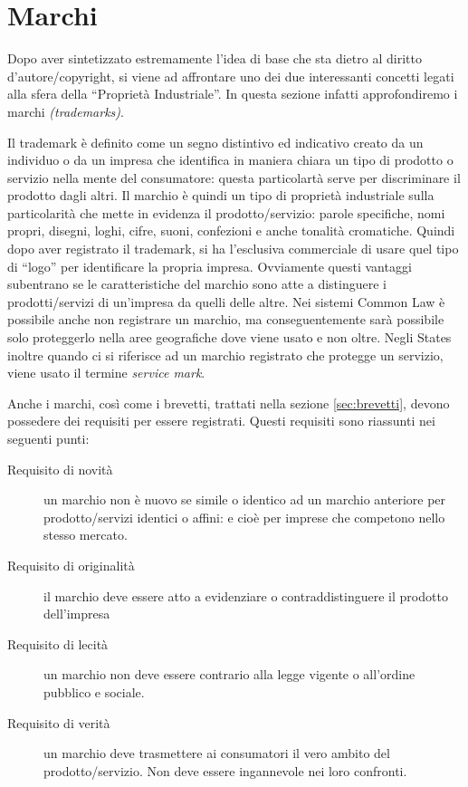 \section{Marchi}
Dopo aver sintetizzato estremamente l'idea di base che sta dietro al diritto d'autore/copyright, si viene ad affrontare uno dei due interessanti concetti legati alla sfera della ``Proprietà Industriale''. In questa sezione infatti approfondiremo i marchi \textit{(trademarks)}.

Il trademark è definito come un segno distintivo ed indicativo creato da un individuo o da un impresa che identifica in maniera chiara un tipo di prodotto o servizio nella mente del consumatore: questa particolartà serve per discriminare il prodotto dagli altri. Il marchio è quindi un tipo di proprietà industriale sulla particolarità che mette in evidenza il prodotto/servizio: parole specifiche, nomi propri, disegni, loghi, cifre, suoni, confezioni e anche tonalità cromatiche. Quindi dopo aver registrato il trademark, si ha l'esclusiva commerciale di usare quel tipo di ``logo'' per identificare la propria impresa. Ovviamente questi vantaggi subentrano se le caratteristiche del marchio sono atte a distinguere i prodotti/servizi di un'impresa da quelli delle altre. Nei sistemi Common Law è possibile anche non registrare un marchio, ma conseguentemente sarà possibile solo proteggerlo nella aree geografiche dove viene usato e non oltre. Negli States inoltre quando ci si riferisce ad un marchio registrato che protegge un servizio, viene usato il termine \textit{service mark}.

Anche i marchi, così come i brevetti, trattati nella sezione \ref{sec:brevetti}, devono possedere dei requisiti per essere registrati. Questi requisiti sono riassunti nei seguenti punti:
\begin{description}
 \item[Requisito di novità] un marchio non è nuovo se simile o identico ad un marchio anteriore per prodotto/servizi identici o affini: e cioè per imprese che competono nello stesso mercato.
 \item[Requisito di originalità] il marchio deve essere atto a evidenziare o contraddistinguere il prodotto dell'impresa
 \item[Requisito di lecità] un marchio non deve essere contrario alla legge vigente o all'ordine pubblico e sociale.
 \item[Requisito di verità] un marchio deve trasmettere ai consumatori il vero ambito del prodotto/servizio. Non deve essere ingannevole nei loro confronti. 
 \end{description}

